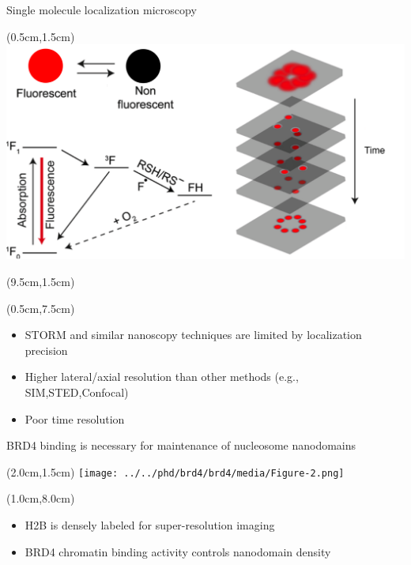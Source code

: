 \documentclass{beamer}					%
\begin{document}
\begin{frame}{Single molecule localization microscopy}
\begin{textblock*}{9cm}(0.5cm,1.5cm)
\includegraphics[width=\textwidth]{../../phd/dissertation/dissertation/media/Intro-Cropped.png}
\end{textblock*}
\begin{textblock*}{5cm}(9.5cm,1.5cm)
\end{textblock*}
\begin{textblock*}{15cm}(0.5cm,7.5cm)
\begin{itemize}
\item STORM and similar nanoscopy techniques are limited by localization precision
\item Higher lateral/axial resolution than other methods (e.g., SIM,STED,Confocal)
\item Poor time resolution
\end{itemize}
\end{textblock*}
\end{frame}


\begin{frame}{BRD4 binding is necessary for maintenance of nucleosome nanodomains}
\begin{textblock*}{10cm}(2.0cm,1.5cm)
\texttt{[image: ../../phd/brd4/brd4/media/Figure-2.png]}
\end{textblock*}

\begin{textblock*}{13cm}(1.0cm,8.0cm)
\begin{itemize}
\item H2B is densely labeled for super-resolution imaging
\item BRD4 chromatin binding activity controls nanodomain density
\end{itemize}
\end{textblock*}
\end{frame}
\end{document}
